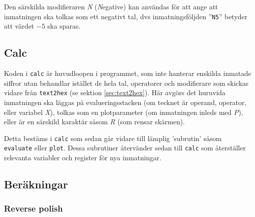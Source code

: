 \documentclass[]{article}
\begin{document}
Den särskilda modifieraren \textit{N} (\textit{N}egative) kan användas för att ange att inmatningen ska tolkas som ett negativt tal, dvs inmatningsföljden ''\texttt{N5}'' betyder att värdet $-5$ ska sparas.

\subsection{Calc}
Koden i \texttt{calc} är huvudloopen i programmet, som inte hanterar enskilda inmatade siffror utan behandlar istället de hela tal, operatorer och modifierare som skickas vidare från \texttt{text2hex} (se sektion \ref{sec:text2hex}). Här avgörs det huruvida inmatningen ska läggas på evalueringsstacken (om tecknet är operand, operator, eller variabel \textit{X}), tolkas som en plotparameter (om inmatningen inleds med \textit{P}), eller är en särskild karaktär såsom \textit{R} (som rensar skärmen).

Detta bestäms i \texttt{calc} som sedan går vidare till lämplig 'subrutin' såsom \texttt{evaluate} eller \texttt{plot}. Dessa subrutiner återvänder sedan till \texttt{calc} som återställer relevanta variabler och register för nya inmatningar.

\subsection{Beräkningar}
\subsubsection{Reverse polish}
\label{sec:reversepolish}
\end{document}
